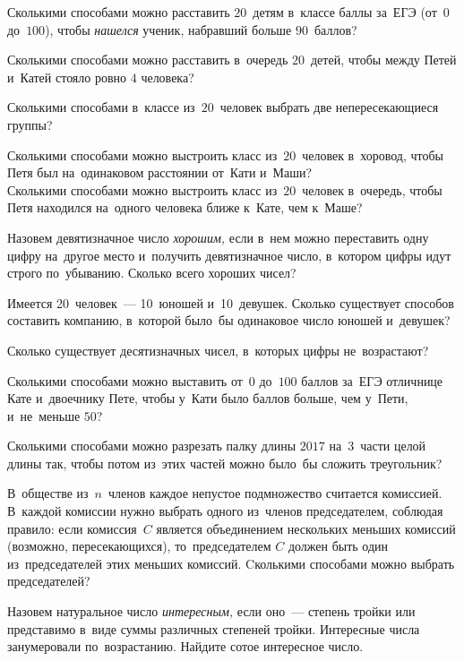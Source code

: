 


\begin{problems}

\item
Сколькими способами можно расставить $20$~детям в~классе баллы за~ЕГЭ
(от~$0$ до~$100$), чтобы \emph{нашелся} ученик, набравший больше $90$~баллов?

\item
Сколькими способами можно расставить в~очередь $20$~детей, чтобы между Петей
и~Катей стояло ровно $4$ человека?

\item
Сколькими способами в~классе из~$20$~человек выбрать две непересекающиеся
группы?

\item
\subproblem
Сколькими способами можно выстроить класс из~$20$~человек в~хоровод, чтобы Петя
был на~одинаковом расстоянии от~Кати и~Маши?
\\
\subproblem
Сколькими способами можно выстроить класс из~$20$~человек в~очередь, чтобы
Петя находился на~одного человека ближе к~Кате, чем к~Маше?

\item
Назовем девятизначное число \emph{хорошим,} если в~нем можно переставить одну
цифру на~другое место и~получить девятизначное число, в~котором цифры идут
строго по~убыванию.
Сколько всего хороших чисел?

\item
Имеется 20~человек~--- 10~юношей и~10~девушек.
Сколько существует способов составить компанию, в~которой было~бы одинаковое
число юношей и~девушек?

\item
Сколько существует десятизначных чисел, в~которых цифры не~возрастают?

\item
Сколькими способами можно выставить от~$0$ до~$100$ баллов за~ЕГЭ
отличнице Кате и~двоечнику Пете, чтобы у~Кати было баллов больше, чем у~Пети,
и~не~меньше $50$?

\item
Сколькими способами можно разрезать палку длины $2017$ на~$3$~части целой длины
так, чтобы потом из~этих частей можно было~бы сложить треугольник?

\item
В~обществе из~$n$~членов каждое непустое подмножество считается комиссией.
В~каждой комиссии нужно выбрать одного из~членов председателем, соблюдая
правило: если комиссия~$C$ является объединением нескольких меньших комиссий
(возможно, пересекающихся), то~председателем $C$ должен быть один
из~председателей этих меньших комиссий.
Cколькими способами можно выбрать председателей?

\item
Назовем натуральное число \emph{интересным,} если оно~--- степень тройки или
представимо в~виде суммы различных степеней тройки.
Интересные числа занумеровали по~возрастанию.
Найдите сотое интересное число.

\end{problems}

